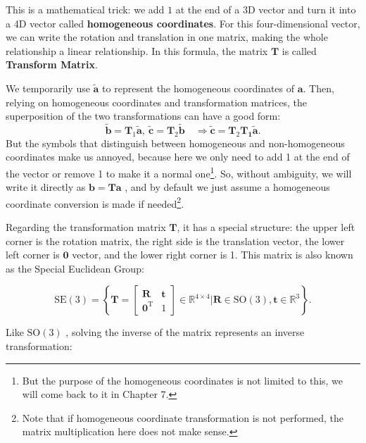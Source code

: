 This is a mathematical trick: we add $ 1 $ at the end of a 3D vector and turn it into a 4D vector called \textbf{homogeneous coordinates}. For this four-dimensional vector, we can write the rotation and translation in one matrix, making the whole relationship a linear relationship. In this formula, the matrix $ \mathbf {T} $ is called \textbf{Transform Matrix}.

We temporarily use $  \tilde { \mathbf {a} } $ to represent the homogeneous coordinates of $ \mathbf {a} $. Then, relying on homogeneous coordinates and transformation matrices, the superposition of the two transformations can have a good form:
\begin{equation}
\tilde{\mathbf{b}} = \mathbf{T}_1 \tilde{\mathbf{a}}, \  \tilde{\mathbf{c}} = \mathbf{T}_2 \tilde{\mathbf{b}} \quad \Rightarrow \tilde{\mathbf{c}} = \mathbf{T}_2 \mathbf{T_1} \tilde{\mathbf{a}}.
\end{equation}
But the symbols that distinguish between homogeneous and non-homogeneous coordinates make us annoyed, because here we only need to add 1 at the end of the vector or remove 1 to make it a normal one\footnote {But the purpose of the homogeneous coordinates is not limited to this, we will come back to it in Chapter 7.}. So, without ambiguity, we will write it directly as $ \mathbf {b}= \mathbf {T} \mathbf {a} $ , and by default we just assume a homogeneous coordinate conversion is made if needed\footnote { Note that if homogeneous coordinate transformation is not performed, the matrix multiplication here does not make sense. }.

Regarding the transformation matrix $ \mathbf{T} $, it has a special structure: the upper left corner is the rotation matrix, the right side is the translation vector, the lower left corner is $ \mathbf{0} $ vector, and the lower right corner is 1. This matrix is also known as the Special Euclidean Group:

\begin{equation}
\mathrm{SE}(3) = \left\{ \mathbf{T} = \left[ {\begin{array}{*{20}{c}}
    \mathbf{R} & \mathbf{t} \\
    {{\mathbf{0}^\mathrm{T}}} & 1
    \end{array}} \right]
\in \mathbb{R}^{4 \times 4} | \mathbf{R} \in \mathrm{SO}(3), \mathbf{t} \in \mathbb{R}^3\right\} .
\end{equation}

Like $ \mathrm{SO}( 3 ) $ , solving the inverse of the matrix represents an inverse transformation:

